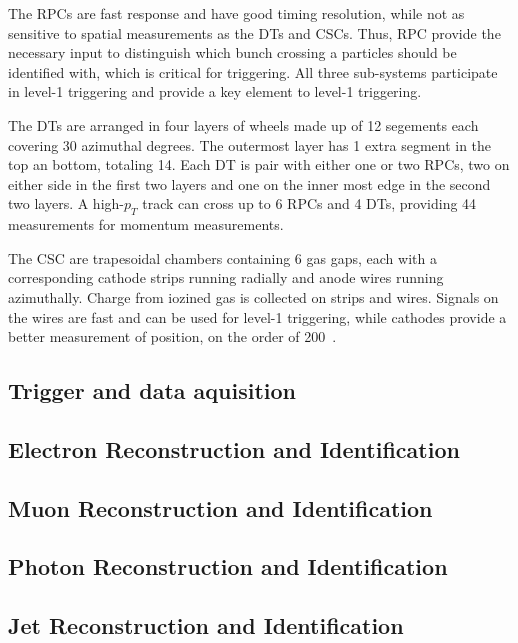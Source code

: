 The RPCs are fast response and have
good timing resolution, while not as sensitive to spatial measurements
as the DTs and CSCs.  Thus, RPC provide the necessary input to distinguish
which bunch crossing a particles should be identified with, which is critical
for triggering.  All three sub-systems participate in level-1 triggering
and provide a key element to level-1 triggering.

The DTs are arranged in four layers of wheels made up of 12 segements
each covering 30 azimuthal degrees.  The outermost layer has 1 extra 
segment in the top an bottom, totaling 14.  Each DT is pair with either
one or two RPCs, two on either side in the first two layers and one on
the inner most edge in the second two layers.  A high-$p_T$ track can 
cross up to 6 RPCs and 4 DTs, providing 44 measurements for momentum 
measurements. 

The CSC are trapesoidal chambers containing 6 gas gaps, each with a 
corresponding cathode strips running radially and anode wires running
azimuthally.  Charge from iozined gas is collected on strips and wires.
Signals on the wires are fast and can be used for level-1 triggering,
while cathodes provide a better measurement of position, on the order
of 200~\microns.

\subsection{Trigger and data aquisition}



\subsection{Electron Reconstruction and Identification}
\label{sec:HZZ4lelectrons}

\subsection{Muon Reconstruction and Identification}
\label{sec:HZZ4lmuons}

\subsection{Photon Reconstruction and Identification}
\label{sec:HZZ4lphotons}

\subsection{Jet Reconstruction and Identification}
\label{sec:HZZ4ljets}
